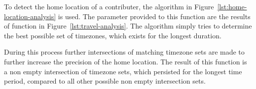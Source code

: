 To detect the home location of a contributer, the algorithm in Figure~\ref{lst:home-location-analysis} is used.
The parameter provided to this function are the results of function  in Figure~\ref{lst:travel-analysis}.
The algorithm simply tries to determine the best possible set of timezones, which exists for the longest duration.

During this process further intersections of matching timezone sets are made to further increase the precision of the home location.
The result of this function is a non empty intersection of timezone sets, which persisted for the longest time period, compared to all other possible non empty intersection sets.
